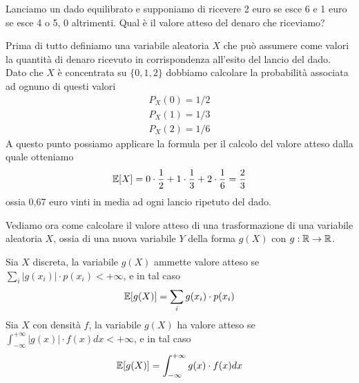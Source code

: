 \begin{example}
	Lanciamo un dado equilibrato e supponiamo di ricevere 2 euro se esce 6 e 1 euro se esce 4 o 5,
	0 altrimenti. Qual è il valore atteso del denaro che riceviamo?

	Prima di tutto definiamo una variabile aleatoria $X$ che può assumere come valori la quantità
	di denaro ricevuto in corrispondenza all'esito del lancio del dado. Dato che $X$ è concentrata
	su $\{ 0, 1, 2 \}$ dobbiamo calcolare la probabilità associata ad ognuno di questi valori
	\begin{gather*}
		P_X(0) = 1 / 2 \\[1ex]
		P_X(1) = 1 / 3 \\[1ex]
		P_X(2) = 1 / 6
	\end{gather*}
	A questo punto possiamo applicare la formula per il calcolo del valore atteso dalla quale
	otteniamo
	\[ \mathbb{E}[X] = 0 \cdot \frac{1}{2} + 1 \cdot \frac{1}{3} + 2 \cdot \frac{1}{6} = \frac{2}{3} \]
	ossia 0,67 euro vinti in media ad ogni lancio ripetuto del dado.
\end{example}

Vediamo ora come calcolare il valore atteso di una trasformazione di una variabile aleatoria $X$,
ossia di una nuova variabile $Y$ della forma $g(X)$ con $g : \mathbb{R} \to \mathbb{R}$.

\begin{proposition}
	Sia $X$ discreta, la variabile $g(X)$ ammette valore atteso se
	$\sum_i |g(x_i)| \cdot p(x_i) < +\infty$, e in tal caso
	\[ \mathbb{E}[g(X)] = \sum_i g(x_i) \cdot p(x_i) \]
	Sia $X$ con densità $f$, la variabile $g(X)$ ha valore atteso se
	$\int_{-\infty}^{+\infty} |g(x)| \cdot f(x) dx < +\infty$, e in tal caso
	\[ \mathbb{E}[g(X)] = \int_{-\infty}^{+\infty} g(x) \cdot f(x) dx \]
\end{proposition}